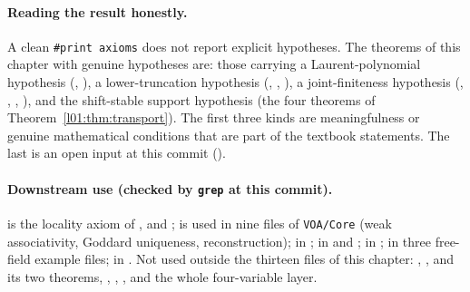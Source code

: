 \paragraph{Reading the result honestly.} A clean \texttt{\#print axioms} does not report explicit hypotheses. The
theorems of this chapter with genuine hypotheses are: those carrying a Laurent-polynomial hypothesis
(, ), a lower-truncation hypothesis (,
, ), a joint-finiteness hypothesis (,
, , ), and the shift-stable
support hypothesis  (the four theorems of Theorem~\ref{l01:thm:transport}). The first three
kinds are meaningfulness or genuine mathematical conditions that are part of the textbook statements. The last is an
open input at this commit ().

\paragraph{Downstream use (checked by \texttt{grep} at this commit).}  is the locality axiom of
,  and ;  is used in nine files of \texttt{VOA/Core} (weak associativity, Goddard
uniqueness, reconstruction);  in ;  in
 and ;  in
;  in three free-field example files;  in
. Not used outside the thirteen files of this chapter: , ,
 and its two theorems, , , , and the whole
four-variable layer.

